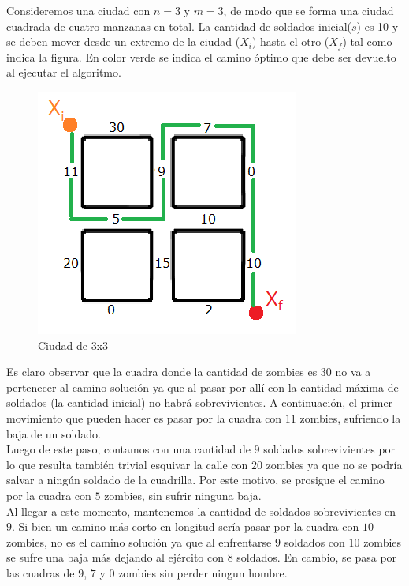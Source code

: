 Consideremos una ciudad con $n=3$ y $m=3$, de modo que se forma una ciudad cuadrada de cuatro manzanas en total. La cantidad de soldados inicial($s$) es 10 y se deben mover desde un extremo de la ciudad ($X_i$) hasta el otro ($X_f$) tal como indica la figura. En color verde se indica el camino \'optimo que debe ser devuelto al ejecutar el algoritmo.\\

  \begin{figure}[h!]
   \begin{center}
 	\includegraphics[scale=0.7]{imagenes/ej2/cuadras.png}
 	\caption{Ciudad de 3x3}
 	\label{ejemplitoCiudad}
   \end{center}
 \end{figure}

\newpage

Es claro observar que la cuadra donde la cantidad de zombies es $30$ no va a pertenecer al camino soluci\'on ya que al pasar por all\'i con la cantidad m\'axima de soldados (la cantidad inicial) no habr\'a sobrevivientes. A continuaci\'on, el primer movimiento que pueden hacer es pasar por la cuadra con $11$ zombies, sufriendo la baja de un soldado.\\

Luego de este paso, contamos con una cantidad de $9$ soldados sobrevivientes por lo que resulta tambi\'en trivial esquivar la calle con $20$ zombies ya que no se podr\'ia salvar a ning\'un soldado de la cuadrilla. Por este motivo, se prosigue el camino por la cuadra con $5$ zombies, sin sufrir ninguna baja.\\

Al llegar a este momento, mantenemos la cantidad de soldados sobrevivientes en $9$. Si bien un camino m\'as corto en longitud ser\'ia pasar por la cuadra con $10$ zombies, no es el camino soluci\'on ya que al enfrentarse $9$ soldados con $10$ zombies se sufre una baja m\'as dejando al ej\'ercito con $8$ soldados. En cambio, se pasa por las cuadras de $9$, $7$ y $0$ zombies sin perder ningun hombre.\\

